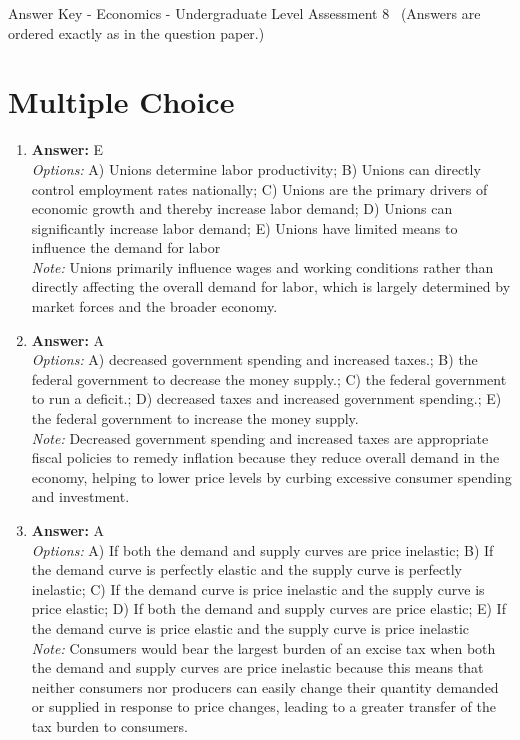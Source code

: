 \documentclass[12pt]{article}
\begin{document}
\begin{center}
Answer Key - Economics - Undergraduate Level Assessment 8 \
\small (Answers are ordered exactly as in the question paper.)
\end{center}

\section*{Multiple Choice}
\begin{enumerate}[label=\arabic*.]
\item \textbf{Answer:} E
\\ \textit{Options:} A) Unions determine labor productivity; B) Unions can directly control employment rates nationally; C) Unions are the primary drivers of economic growth and thereby increase labor demand; D) Unions can significantly increase labor demand; E) Unions have limited means to influence the demand for labor
\\ \textit{Note:} Unions primarily influence wages and working conditions rather than directly affecting the overall demand for labor, which is largely determined by market forces and the broader economy.
\item \textbf{Answer:} A
\\ \textit{Options:} A) decreased government spending and increased taxes.; B) the federal government to decrease the money supply.; C) the federal government to run a deficit.; D) decreased taxes and increased government spending.; E) the federal government to increase the money supply.
\\ \textit{Note:} Decreased government spending and increased taxes are appropriate fiscal policies to remedy inflation because they reduce overall demand in the economy, helping to lower price levels by curbing excessive consumer spending and investment.
\item \textbf{Answer:} A
\\ \textit{Options:} A) If both the demand and supply curves are price inelastic; B) If the demand curve is perfectly elastic and the supply curve is perfectly inelastic; C) If the demand curve is price inelastic and the supply curve is price elastic; D) If both the demand and supply curves are price elastic; E) If the demand curve is price elastic and the supply curve is price inelastic
\\ \textit{Note:} Consumers would bear the largest burden of an excise tax when both the demand and supply curves are price inelastic because this means that neither consumers nor producers can easily change their quantity demanded or supplied in response to price changes, leading to a greater transfer of the tax burden to consumers.

\end{enumerate}
\end{document}
